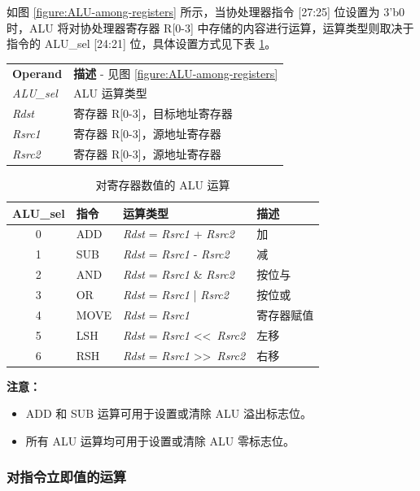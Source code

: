 \documentclass[main\_\_CN.tex]{subfiles}
\begin{document}
如图 \ref{figure:ALU-among-registers} 所示，当协处理器指令 [27:25] 位设置为 3'b0 时，ALU 将对协处理器寄存器 R[0-3] 中存储的内容进行运算，运算类型则取决于指令的 ALU\_sel [24:21] 位，具体设置方式见下表 \ref{table:ALU-among-registers}。

\begin{tabular}{ l l }
\textbf{Operand} & \textbf{描述} - 见图 \ref{figure:ALU-among-registers} \\
\textit{ALU\_sel} & ALU 运算类型\\
\textit{Rdst} & 寄存器 R[0-3]，目标地址寄存器 \\
\textit{Rsrc1} & 寄存器 R[0-3]，源地址寄存器 \\
\textit{Rsrc2} & 寄存器 R[0-3]，源地址寄存器
\end{tabular}

\begin{table}[H]
    \centering
    \begin{tabular}{ c l l l }
    \textbf{ALU\_sel} & \textbf{指令} & \textbf{运算类型} & \textbf{描述} \\ \hline
    0 & ADD & \textit{Rdst} = \textit{Rsrc1} + \textit{Rsrc2} & 加 \\
    1 & SUB & \textit{Rdst} = \textit{Rsrc1} - \textit{Rsrc2} & 减 \\
    2 & AND & \textit{Rdst} = \textit{Rsrc1} \& \textit{Rsrc2} & 按位与 \\
    3 & OR & \textit{Rdst} = \textit{Rsrc1} | \textit{Rsrc2} & 按位或 \\
    4 & MOVE & \textit{Rdst} = \textit{Rsrc1} & 寄存器赋值 \\
    5 & LSH & \textit{Rdst} = \textit{Rsrc1} \textless\textless\  \textit{Rsrc2} & 左移 \\
    6 & RSH & \textit{Rdst} = \textit{Rsrc1} \textgreater\textgreater\  \textit{Rsrc2} & 右移 \\
    \end{tabular}
    \caption{对寄存器数值的 ALU 运算}
    \label{table:ALU-among-registers}
\end{table}

\textbf{注意：}
\begin{itemize}
    \item ADD 和 SUB 运算可用于设置或清除 ALU 溢出标志位。
    \item 所有 ALU 运算均可用于设置或清除 ALU 零标志位。
\end{itemize}


\subsubsection{对指令立即值的运算}
\end{document}
